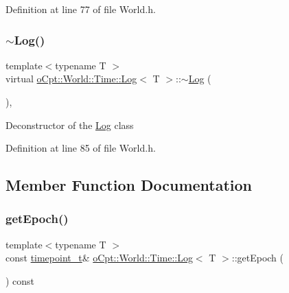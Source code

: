 Definition at line 77 of file World.\+h.

\hypertarget{classo_cpt_1_1_world_1_1_time_1_1_log_a842b91ce3d76d1a4e0a95831944baca5}{}\label{classo_cpt_1_1_world_1_1_time_1_1_log_a842b91ce3d76d1a4e0a95831944baca5} 
\subsubsection{\texorpdfstring{$\sim$\+Log()}{~Log()}}
{\footnotesize\ttfamily template$<$typename T $>$ \\
virtual \hyperlink{classo_cpt_1_1_world_1_1_time_1_1_log}{o\+Cpt\+::\+World\+::\+Time\+::\+Log}$<$ T $>$\+::$\sim$\hyperlink{classo_cpt_1_1_world_1_1_time_1_1_log}{Log} (\begin{DoxyParamCaption}{ }\end{DoxyParamCaption})\hspace{0.3cm}{\ttfamily [inline]}, {\ttfamily [virtual]}}

Deconstructor of the \hyperlink{classo_cpt_1_1_world_1_1_time_1_1_log}{Log} class 

Definition at line 85 of file World.\+h.



\subsection{Member Function Documentation}
\hypertarget{classo_cpt_1_1_world_1_1_time_1_1_log_abf0caaa0f48e2316200cad9d3dff46bc}{}\label{classo_cpt_1_1_world_1_1_time_1_1_log_abf0caaa0f48e2316200cad9d3dff46bc} 
\subsubsection{\texorpdfstring{get\+Epoch()}{getEpoch()}}
{\footnotesize\ttfamily template$<$typename T $>$ \\
const \hyperlink{classo_cpt_1_1_world_1_1_time_a6a6e782c3c90622c1c7070b0a223ec4c}{timepoint\+\_\+t}\& \hyperlink{classo_cpt_1_1_world_1_1_time_1_1_log}{o\+Cpt\+::\+World\+::\+Time\+::\+Log}$<$ T $>$\+::get\+Epoch (\begin{DoxyParamCaption}{ }\end{DoxyParamCaption}) const\hspace{0.3cm}{\ttfamily [inline]}}

